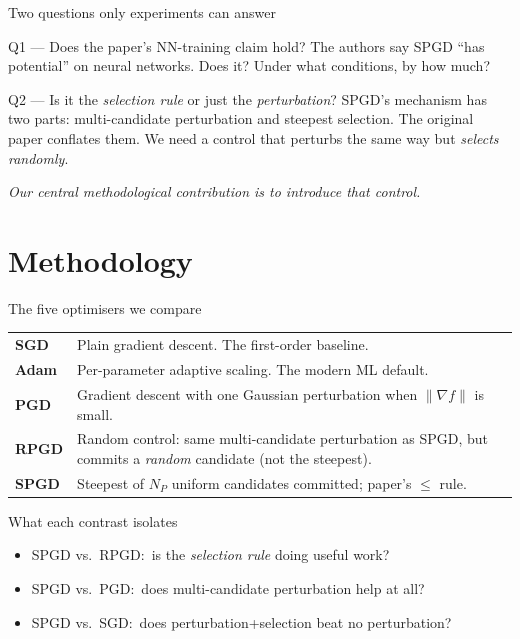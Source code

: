 \documentclass[11pt,aspectratio=169]{beamer}
\newcommand{\np}{\ensuremath{N_P}}
\begin{document}
\begin{frame}{Two questions only experiments can answer}
  \begin{block}{Q1 --- Does the paper's NN-training claim hold?}
    The authors say SPGD ``has potential'' on neural networks. Does it?
    Under what conditions, by how much?
  \end{block}

  \vspace{0.6em}
  \begin{block}{Q2 --- Is it the \emph{selection rule} or just the \emph{perturbation}?}
    SPGD's mechanism has two parts: \alert{multi-candidate perturbation}
    and \alert{steepest selection}. The original paper conflates them.
    We need a control that perturbs the same way but \emph{selects randomly}.
  \end{block}

  \vspace{0.4em}
  \pause
  \centering
  \emph{Our central methodological contribution is to introduce that control.}
\end{frame}


\section{Methodology}

\begin{frame}{The five optimisers we compare}
  \small
  \begin{tabular}{>{\bfseries}l p{}}
    \toprule
    SGD  & Plain gradient descent. The first-order baseline. \\[0.2em]
    Adam & Per-parameter adaptive scaling. The modern ML default. \\[0.2em]
    PGD  & Gradient descent with one Gaussian perturbation when \(\|\nabla f\|\) is small. \\[0.2em]
    \alert{RPGD} & \alert{Random control:} same multi-candidate perturbation as SPGD, but commits a \emph{random} candidate (not the steepest). \\[0.2em]
    SPGD & Steepest of \np{} uniform candidates committed; paper's \(\le\) rule. \\
    \bottomrule
  \end{tabular}

  \vspace{0.7em}
  \begin{block}{What each contrast isolates}
    \begin{itemize}\setlength\itemsep{0.2em}
      \item SPGD vs.\ \alert{RPGD}: \,is the \emph{selection rule} doing useful work?
      \item SPGD vs.\ PGD: \,does multi-candidate perturbation help at all?
      \item SPGD vs.\ SGD: \,does perturbation+selection beat no perturbation?
    \end{itemize}
  \end{block}
\end{frame}
\end{document}
